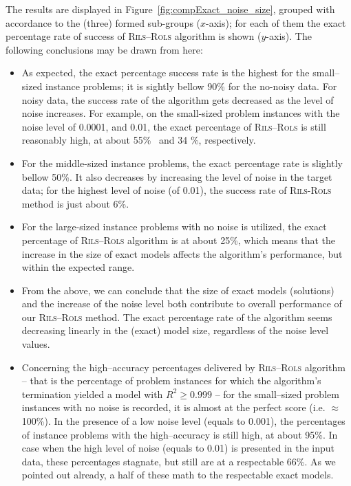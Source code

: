 \documentclass[a4paper,12pt]{elsarticle}
\begin{document}
The results are displayed in Figure~\ref{fig:compExact_noise_size}, grouped with accordance to the (three) formed sub-groups ($x$-axis); for each of them the exact percentage rate of success of \textsc{Rils}--\textsc{Rols} algorithm is shown ($y$-axis). The following conclusions may be drawn from here:

\begin{itemize}
	\item   As expected, the exact percentage success rate is the highest for the small--sized instance problems; it is sightly bellow 90\% for the no-noisy data. For noisy data, the success rate of the algorithm gets decreased as the level of noise increases. For example, on the small-sized problem instances with the noise level  of 0.0001, and 0.01, the exact percentage of \textsc{Rils}--\textsc{Rols} is still reasonably high, at about 55\%~ and 34 \%, respectively. 
	\item For the middle-sized instance problems, the exact percentage rate is slightly bellow 50\%. It also decreases by increasing the level of noise in the target data; for the highest level of noise (of 0.01), the success rate of \textsc{Rils}-\textsc{Rols} method is just about 6\%. 
	\item For the large-sized instance problems with no noise is utilized, the exact percentage of \textsc{Rils}--\textsc{Rols} algorithm is at about 25\%, which means that the increase in the size of exact models affects the algorithm's performance, but within the expected range.  
	
	\item From the above, we can conclude that the size of exact models (solutions) and the increase of the noise level both contribute to overall performance of our \textsc{Rils}--\textsc{Rols} method. The exact percentage rate of the algorithm seems decreasing linearly  in the (exact) model size, regardless of the noise level values.
	
	\item Concerning the high--accuracy percentages delivered by \textsc{Rils}--\textsc{Rols} algorithm -- that is the percentage of problem instances for which the algorithm's termination yielded a model with $R^2 \geq 0.999$ -- for the small--sized problem instances with no noise is recorded, it is almost at the perfect score (i.e. $\approx$100\%). In the presence of a low noise level (equals to 0.001), the percentages of instance problems with the high--accuracy is still high, at about 95\%. In case when the high level of noise (equals to 0.01) is presented in the input data, these percentages stagnate, but still are at a respectable 66\%. %
	As we pointed out already, a half of these math to the respectable exact models.
	

\end{itemize}
\end{document}

